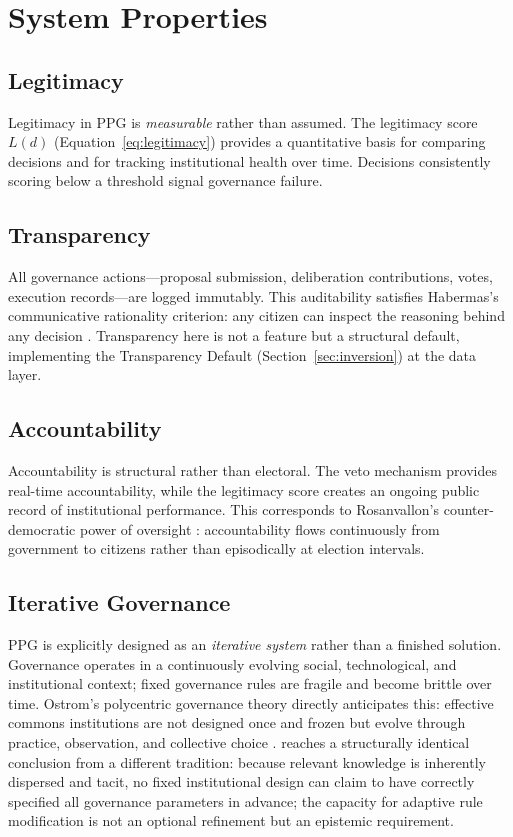 \documentclass[12pt,a4paper,oneside]{report}
\begin{document}
\chapter{System Properties}
\label{sec:properties}

\section{Legitimacy}

Legitimacy in PPG is \emph{measurable} rather than assumed. The legitimacy score $L(d)$ (Equation~\ref{eq:legitimacy}) provides a quantitative basis for comparing decisions and for tracking institutional health over time. Decisions consistently scoring below a threshold signal governance failure.

\section{Transparency}

All governance actions---proposal submission, deliberation contributions, votes, execution records---are logged immutably. This auditability satisfies Habermas's communicative rationality criterion: any citizen can inspect the reasoning behind any decision \citep{habermas1996between}. Transparency here is not a feature but a structural default, implementing the Transparency Default (Section~\ref{sec:inversion}) at the data layer.

\section{Accountability}

Accountability is structural rather than electoral. The veto mechanism provides real-time accountability, while the legitimacy score creates an ongoing public record of institutional performance. This corresponds to Rosanvallon's counter-democratic power of oversight \citep{rosanvallon2008counter}: accountability flows continuously from government to citizens rather than episodically at election intervals.

\section{Iterative Governance}

PPG is explicitly designed as an \emph{iterative system} rather than a finished solution. Governance operates in a continuously evolving social, technological, and institutional context; fixed governance rules are fragile and become brittle over time. Ostrom's polycentric governance theory directly anticipates this: effective commons institutions are not designed once and frozen but evolve through practice, observation, and collective choice \citep{ostrom1990governing}. \citet{hayek1945use} reaches a structurally identical conclusion from a different tradition: because relevant knowledge is inherently dispersed and tacit, no fixed institutional design can claim to have correctly specified all governance parameters in advance; the capacity for adaptive rule modification is not an optional refinement but an epistemic requirement.
\end{document}
